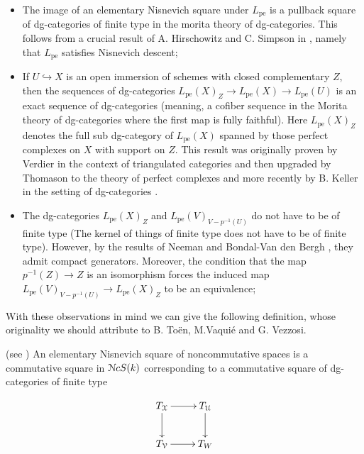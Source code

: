 \begin{refsection}
\begin{itemize}
\item The image of an elementary Nisnevich square under $L_\mathrm{pe}$ is a pullback square of dg-categories of finite type in the morita theory of dg-categories. This follows from a crucial result of A. Hirschowitz  and C. Simpson in \cite{simpson-descente}, namely that $L_\mathrm{pe}$ satisfies Nisnevich descent;
\item If $U\hookrightarrow X$ is an open immersion of schemes with closed complementary $Z$, then the sequences of dg-categories $L_\mathrm{pe}(X)_{Z}\to L_\mathrm{pe}(X)\to L_\mathrm{pe}(U)$ is an exact sequence of dg-categories (meaning, a cofiber sequence in the Morita theory of dg-categories where the first map is fully faithful). Here $L_\mathrm{pe}(X)_{Z}$ denotes the full sub dg-category of $L_\mathrm{pe}(X)$ spanned by those perfect complexes on $X$ with support on $Z$. This result was originally proven by Verdier \cite{Verdier} in the context of triangulated categories and then upgraded by Thomason \cite{thomasonalgebraic} to the theory of perfect complexes and more recently by B. Keller in the setting of dg-categories \cite{keller-exact}.
\item The dg-categories $L_\mathrm{pe}(X)_{Z}$ and $L_\mathrm{pe}(V)_{V-p^{-1}(U)}$ do not have to be of finite type (The kernel of things of finite type does not have to be of finite type). However, by the results of Neeman \cite{neeman} and Bondal-Van den Bergh \cite{bondal-vandenbergh}, they admit compact generators. Moreover, the condition that the map $p^{-1}(Z)\to Z$ is an isomorphism forces the induced map $L_\mathrm{pe}(V)_{V-p^{-1}(U)}\to  L_\mathrm{pe}(X)_{Z}$ to be an equivalence;
\end{itemize}

With these observations in mind we can give the following definition, whose originality we should attribute to B. To\"en, M.Vaqui\'e and G. Vezzosi.

\begin{defin}(see \cite[6.44]{nc1})
An elementary Nisnevich square of noncommutative spaces is a commutative square in $\mathcal{N}cS(k)$ corresponding to a commutative square of dg-categories of finite type

$$
\xymatrix{
T_{\mathcal X}\ar[r] \ar[d] & T_{\mathcal U}\ar[d]\\
T_{\mathcal V}\ar[r]& T_{W}
}
$$


\end{defin}
\end{refsection}

